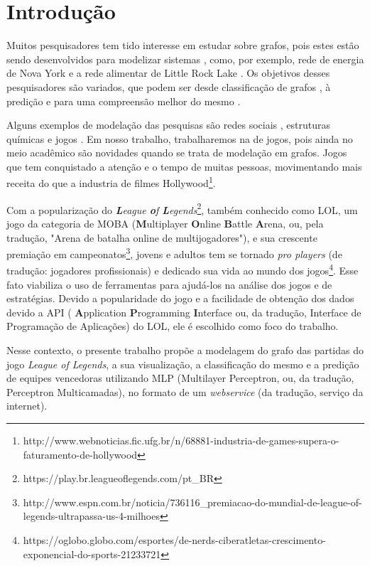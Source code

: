 \chapter{Introdução}
\label{chap:Introducao}

Muitos pesquisadores tem tido interesse em estudar sobre grafos, pois estes estão sendo desenvolvidos para modelizar sistemas \cite{joachim}, como, por exemplo, rede de energia de Nova York e a rede alimentar de Little Rock Lake \cite{strogatz}.
Os objetivos desses pesquisadores são variados, que podem ser desde classificação de grafos \cite{fbclass}, à predição \cite{dota} e para uma compreensão melhor do mesmo \cite{rosvall2008maps}. 

Alguns exemplos de modelação das pesquisas são redes sociais \cite{fbclass}, estruturas químicas \cite{rosvall2008maps} e jogos \cite{dota}. Em nosso trabalho, trabalharemos na de jogos, pois ainda no meio acadêmico são novidades quando se trata de modelação em grafos.
Jogos que tem conquistado a atenção e o tempo de muitas pessoas, movimentando mais receita do que a industria de filmes Hollywood\footnote{http://www.webnoticias.fic.ufg.br/n/68881-industria-de-games-supera-o-faturamento-de-hollywood}.

Com a popularização do \textit{\textbf{L}eague \textbf{o}f \textbf{L}egends}\footnote{https://play.br.leagueoflegends.com/pt\_BR}, também conhecido como LOL, um jogo da categoria de MOBA (\textbf{M}ultiplayer \textbf{O}nline \textbf{B}attle \textbf{A}rena, ou, pela tradução, "Arena de batalha online de multijogadores"), e sua crescente premiação em campeonatos\footnote{http://www.espn.com.br/noticia/736116\_premiacao-do-mundial-de-league-of-legends-ultrapassa-us-4-milhoes}, jovens e adultos tem se tornado \textit{pro players} (de tradução: jogadores profissionais) e dedicado sua vida ao mundo dos jogos\footnote{https://oglobo.globo.com/esportes/de-nerds-ciberatletas-crescimento-exponencial-do-sports-21233721}. 
Esse fato viabiliza o uso de ferramentas para ajudá-los na análise dos jogos e de estratégias. 
Devido a popularidade do jogo e a facilidade de obtenção dos dados devido a API ( \textbf{A}pplication \textbf{P}rogramming \textbf{I}nterface ou, da tradução, Interface de Programação de Aplicações) do LOL, ele é escolhido como foco do trabalho.

Nesse contexto, o presente trabalho propõe a modelagem do grafo das partidas do jogo \textit{League of Legends}, a sua visualização, a classificação do mesmo e a predição de equipes vencedoras utilizando MLP (Multilayer Perceptron, ou, da tradução, Perceptron Multicamadas), no formato de um \textit{webservice} (da tradução, serviço da internet).


